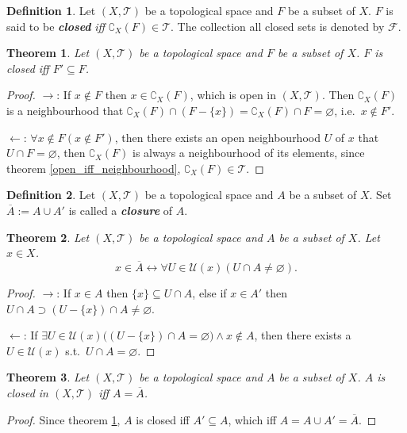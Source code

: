 \documentclass[openany]{book}
\newcommand*{\indexbf}[1]{\emph{\textbf{#1}}\index{#1}} %
\theoremstyle{plain}
\newtheorem{theorem}{Theorem}[section] %
\theoremstyle{definition}
\newtheorem{definition}{Definition}[section] %
\begin{document}
\begin{definition}\label{closed_set}
Let $(X,\mathscr T)$ be a topological space and $F$ be a subset of $X$. $F$ is said to be \indexbf{closed} \emph{iff} $\complement_X (F) \in \mathscr T$. The collection all closed sets is denoted by $\mathscr F$.
\end{definition}

\begin{theorem}\label{closed_iff_accumulation}
Let $(X,\mathscr T)$ be a topological space and $F$ be a subset of $X$. $F$ is closed \emph{iff} $ F'  \subseteq F$.
\end{theorem}
\begin{proof}
$\to$: 
If $x\notin F$ then $x\in \complement_X (F)$, which is open in $(X,\mathscr T)$. 
Then $\complement_X (F)$ is a neighbourhood that $\complement_X (F) \cap (F-\{x\}) = \complement_X (F) \cap F =\varnothing$, i.e.\ $x\notin F'$.

$\leftarrow$:
$\forall x\notin F(x\notin F')$, then there exists an open neighbourhood $U$ of $x$ that $U\cap F = \varnothing$, then $\complement_X (F)$ is always a neighbourhood of its elements, since theorem \ref{open_iff_neighbourhood}, $\complement_X (F) \in \mathscr T$.
\end{proof}

\begin{definition}\label{closure}
Let $(X,\mathscr T)$ be a topological space and $A$ be a subset of $X$. Set $\overline A := A\cup A'$ is called a \indexbf{closure} of $A$.
\end{definition}

\begin{theorem}\label{closure_neighbourhood}
Let $(X,\mathscr T)$ be a topological space and $A$ be a subset of $X$. Let $x\in X$.
\[
	x\in \overline A \leftrightarrow
		\forall U\in\mathscr U(x)(
			U\cap A\neq \varnothing).
\]
\end{theorem}
\begin{proof}
$\to$: If $x\in A$ then $\{x\}\subseteq U\cap A$, 
else if $x\in A'$ then $U\cap A \supset (U-\{x\})\cap A \neq \varnothing$.

$\leftarrow$: 
If $\exists U\in\mathscr U(x)\big(
	(U-\{x\})\cap A= \varnothing\big)\wedge x\notin A$, 
then there exists a $U\in \mathscr U(x)$ s.t.\ $U\cap A=\varnothing$. 
\end{proof}


\begin{theorem}\label{closed_iff_closure}
Let $(X,\mathscr T)$ be a topological space and $A$ be a subset of $X$. 
$A$ is closed in $(X,\mathscr T)$ \emph{iff} $A=\overline A$.
\end{theorem}
\begin{proof}
Since theorem \ref{closed_iff_accumulation}, $A$ is closed iff $A'\subseteq A$, which iff $A = A\cup A' = \overline A$.
\end{proof}
\end{document}
